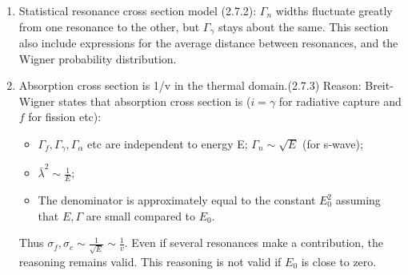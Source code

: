 \documentclass{school-22.211-notes}
\begin{document}
\begin{enumerate}
\item Statistical resonance cross section model (2.7.2): $\Gamma_n$ widths fluctuate greatly from one resonance to the other, but $\Gamma_{\gamma}$ stays about the same. This section also include expressions for the average distance between resonances, and the Wigner probability distribution. 
\item Absorption cross section is 1/v in the thermal domain.(2.7.3) Reason: Breit-Wigner states that absorption cross section is ($i = \gamma$ for radiative capture and $f$ for fission etc):
  \begin{itemize}
  \item $\Gamma_f, \Gamma_{\gamma}, \Gamma_{\alpha}$ etc are independent to energy E; $\Gamma_n \sim \sqrt{E}$ (for s-wave);
  \item $\bar{\lambda}^2 \sim \frac{1}{E}$;
  \item The denominator is approximately equal to the constant $E_0^2$ assuming that $E, \Gamma$ are small compared to $E_0$.
  \end{itemize}
  Thus $\sigma_f, \sigma_c \sim \frac{1}{\sqrt{E}} \sim \frac{1}{v}$. Even if several resonances make a contribution, the reasoning remains valid. This reasoning is not valid if $E_0$ is close to zero. 
\end{enumerate}
\end{document}
